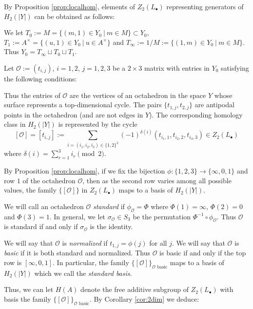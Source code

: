 \documentclass[12pt]{amsart}
\theoremstyle{definition}
\newcommand{\oct}{\mathcal{O}}%
\newcommand{\cyc}[1]{\left[ #1\right]} %
\newcommand{\<}{\langle}
\renewcommand{\>}{\rangle}
\begin{document}
By Proposition \ref{prop:localhom}, elements of $Z_2(L_\bullet)$ representing generators of $H_2(|Y|)$ can be obtained as follows:

We let $T_0:=M=\{ (m,1)\in Y_0\ |\  m\in M\}\subset Y_0$, $T_1:=A^\times=\{ (u,1)\in Y_0\  |\  u\in A^\times\}$ and 
$T_\infty:= 1/M:= \{ (1,m)\in Y_0\ |\ m\in M\}$. Thus $Y_0=T_\infty\sqcup T_0\sqcup T_1$.


 Let $\oct:= (t_{i,j})$, $i=1,2$, $j=1,2,3$ be a $2\times 3$ matrix with entries 
in $Y_0$ satisfying the following conditions:
Thus the entries of $\oct$ are the vertices of an octahedron in the space $Y$ whose surface represents a top-dimensional cycle. The pairs $\{ t_{1,j},t_{2,j}\}$ are antipodal points in the octahedron (and are not edges in $Y$). The corresponding homology class in $H_2(|Y|)$ is represented by the cycle
\[
\cyc{\oct}=\cyc{t_{i,j}}:= \sum_{i=(i_1,i_2,i_3)\in \{ 1,2\}^3}(-1)^{\delta(i)}(t_{i_1,1},t_{i_2,2},t_{i_3,3})\in Z_2(L_\bullet)
\]
where $\delta(i)=\sum_{r=1}^3 i_r\pmod{2}$. 

By Proposition \ref{prop:localhom}, if we fix the bijection $\phi:\{1,2,3\}\to \{\infty,0,1\}$ and row $1$ of the octahedron $\oct$, then as the second row varies among all possible 
values,  the family $\{ \cyc{\oct}\}$ in $Z_2(L_\bullet)$  maps to a basis of $H_2(|Y|)$.

We will call an octahedron $\oct$ \emph{standard} if $\phi_\oct=\Phi$ where $\Phi(1)=\infty$, $\Phi(2)=0$ and $\Phi(3)=1$. In general, we let $\sigma_\oct\in S_3$ be the permutation
$\Phi^{-1}\circ \phi_\oct$. Thus $\oct$ is standard if and only if $\sigma_\oct$ is the identity.

We will say that $\oct$ is \emph{normalized} if $t_{1,j}=\phi(j)$ for all $j$. We will say that $\oct$ is \emph{basic} if it is both standard and normalized. 
Thus $\oct$ is basic if and only if the top row 
is $[ \infty,0,1]$. In particular, the family $\{ \cyc{\oct}\}_{\oct \mbox{ basic}}$ maps to a basis of $H_2(|Y|)$ which we call the \emph{standard basis}. 


Thus, we can let $H(A)$ denote the free additive subgroup of $Z_2(L_\bullet)$ with basis the family $\{ \cyc{\oct}\}_{\oct \mbox{ basic}}$. By Corollary \ref{cor:2dim} 
we deduce:
\end{document}
